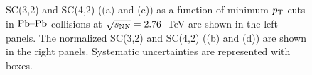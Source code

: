 \begin{figure}
	\begin{center}
        \caption{SC(3,2) and SC(4,2) ((a) and (c)) as a function of minimum $p_{\rm T}$ cuts in $\textnormal{Pb--Pb}$ collisions at $\sqrt{s_{\textnormal{NN}}}=2.76$~TeV are shown in the left panels. The normalized SC(3,2) and SC(4,2) ((b) and (d)) are shown in the right panels. Systematic uncertainties are represented with boxes.} %
        \label{fig:Figure_2}
        \end{center}   
\end{figure}

